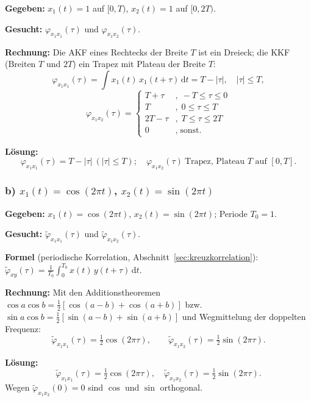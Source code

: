 \begin{beispiel}

\textbf{Gegeben:} $x_1(t)=1$ auf $[0,T)$, $x_2(t)=1$ auf $[0,2T)$.

\textbf{Gesucht:} $\varphi_{x_1 x_1}(\tau)$ und $\varphi_{x_1 x_2}(\tau)$.

\textbf{Rechnung:} Die AKF eines Rechtecks der Breite $T$ ist ein Dreieck; die KKF
(Breiten $T$ und $2T$) ein Trapez mit Plateau der Breite $T$:
$$
\varphi_{x_1 x_1}(\tau) = \int x_1(t)\,x_1(t+\tau)\,\mathrm{d}t = T-|\tau|,\quad |\tau|\leq T,
$$
$$
\varphi_{x_1 x_2}(\tau) = \begin{cases}
T+\tau & , \; -T\leq \tau \leq 0 \\
T & , \; 0\leq \tau \leq T \\
2T-\tau & , \; T\leq \tau \leq 2T \\
0 & , \; \text{sonst.}
\end{cases}
$$

\textbf{Lösung:}
$$
\boxed{\;\varphi_{x_1 x_1}(\tau)=T-|\tau|\ (|\tau|\leq T);\quad
\varphi_{x_1 x_2}(\tau)\ \text{Trapez, Plateau } T \text{ auf } [0,T].\;}
$$
\end{beispiel}

\subsubsection*{b) $x_1(t)=\cos(2\pi t)$, $x_2(t)=\sin(2\pi t)$}

\begin{beispiel}

\textbf{Gegeben:} $x_1(t)=\cos(2\pi t)$, $x_2(t)=\sin(2\pi t)$; Periode $T_0=1$.

\textbf{Gesucht:} $\tilde{\varphi}_{x_1 x_1}(\tau)$ und $\tilde{\varphi}_{x_1 x_2}(\tau)$.

\textbf{Formel} (periodische Korrelation, Abschnitt~\ref{sec:kreuzkorrelation}):
$\tilde{\varphi}_{xy}(\tau)=\tfrac{1}{T_0}\int_0^{T_0} x(t)\,y(t+\tau)\,\mathrm{d}t$.

\textbf{Rechnung:} Mit den Additionstheoremen
$\cos a\cos b=\tfrac12[\cos(a-b)+\cos(a+b)]$ bzw.\
$\sin a\cos b=\tfrac12[\sin(a-b)+\sin(a+b)]$ und Wegmittelung der doppelten
Frequenz:
$$
\tilde{\varphi}_{x_1 x_1}(\tau) = \tfrac12\cos(2\pi\tau),\qquad
\tilde{\varphi}_{x_1 x_2}(\tau) = \tfrac12\sin(2\pi\tau).
$$

\textbf{Lösung:}
$$
\boxed{\;\tilde{\varphi}_{x_1 x_1}(\tau)=\tfrac12\cos(2\pi\tau),\quad
\tilde{\varphi}_{x_1 x_2}(\tau)=\tfrac12\sin(2\pi\tau).\;}
$$
Wegen $\tilde{\varphi}_{x_1 x_2}(0)=0$ sind $\cos$ und $\sin$ orthogonal.
\end{beispiel}

